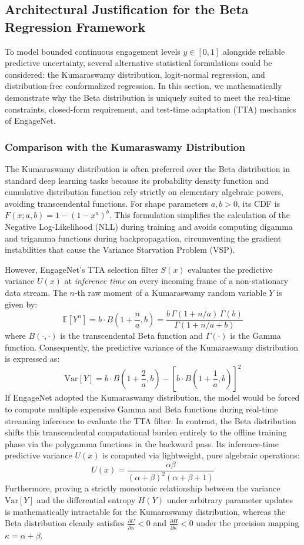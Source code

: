 \documentclass[11pt,a4paper]{article}
\begin{document}
	\subsection{Architectural Justification for the Beta Regression Framework}
	To model bounded continuous engagement levels $y \in [0,1]$ alongside reliable predictive uncertainty, several alternative statistical formulations could be considered: the Kumaraswamy distribution, logit-normal regression, and distribution-free conformalized regression. In this section, we mathematically demonstrate why the Beta distribution is uniquely suited to meet the real-time constraints, closed-form requirement, and test-time adaptation (TTA) mechanics of EngageNet.
	
	\subsubsection*{Comparison with the Kumaraswamy Distribution}
	The Kumaraswamy distribution \cite{kumaraswamy1980} is often preferred over the Beta distribution in standard deep learning tasks \cite{pumi2020} because its probability density function and cumulative distribution function rely strictly on elementary algebraic powers, avoiding transcendental functions. For shape parameters $a, b > 0$, its CDF is $F(x; a, b) = 1 - (1-x^a)^b$. This formulation simplifies the calculation of the Negative Log-Likelihood (NLL) during training and avoids computing digamma and trigamma functions during backpropagation, circumventing the gradient instabilities that cause the Variance Starvation Problem (VSP).
	
	However, EngageNet's TTA selection filter $S(x)$ evaluates the predictive variance $U(x)$ at \textit{inference time} on every incoming frame of a non-stationary data stream. The $n$-th raw moment of a Kumaraswamy random variable $Y$ is given by:
	$$\mathbb{E}[Y^n] = b \cdot B\left(1 + \frac{n}{a}, b\right) = \frac{b \, \Gamma(1 + n/a)\,\Gamma(b)}{\Gamma(1 + n/a + b)}$$
	where $B(\cdot,\cdot)$ is the transcendental Beta function and $\Gamma(\cdot)$ is the Gamma function. Consequently, the predictive variance of the Kumaraswamy distribution is expressed as:
	$$\text{Var}[Y] = b \cdot B\left(1 + \frac{2}{a}, b\right) - \left[ b \cdot B\left(1 + \frac{1}{a}, b\right) \right]^2$$
	If EngageNet adopted the Kumaraswamy distribution, the model would be forced to compute multiple expensive Gamma and Beta functions during real-time streaming inference to evaluate the TTA filter. In contrast, the Beta distribution shifts this transcendental computational burden entirely to the offline training phase via the polygamma functions in the backward pass. Its inference-time predictive variance $U(x)$ is computed via lightweight, pure algebraic operations:
	$$U(x) = \frac{\alpha \beta}{(\alpha + \beta)^2 (\alpha + \beta + 1)}$$
	Furthermore, proving a strictly monotonic relationship between the variance $\text{Var}[Y]$ and the differential entropy $H(Y)$ under arbitrary parameter updates is mathematically intractable for the Kumaraswamy distribution, whereas the Beta distribution cleanly satisfies $\frac{\partial U}{\partial \kappa} < 0$ and $\frac{\partial H}{\partial \kappa} < 0$ under the precision mapping $\kappa = \alpha + \beta$.
	
\end{document}
